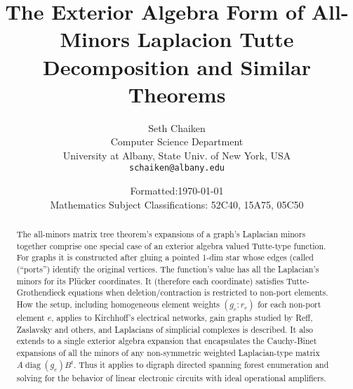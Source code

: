 \documentclass[12pt]{article}
\title{The Exterior Algebra Form of All-Minors Laplacion Tutte
  Decomposition and Similar Theorems}
\author{Seth Chaiken\\
\small Computer Science Department\\[-0.8ex]
\small University at Albany, State Univ. of New York, USA\\[-0.8ex]
\small \texttt{schaiken@albany.edu}
}
\date{
Formatted:\today\\
\small Mathematics Subject Classifications: 52C40, 15A75, 05C50}
\begin{document}
\maketitle

\begin{abstract}
  The all-minors matrix tree theorem's expansions of a graph's
  Laplacian minors together comprise one special case of an exterior
  algebra valued Tutte-type function.  For graphs it is constructed
  after gluing a pointed 1-dim star whose edges (called (``ports'')
  identify the original vertices.  The function's value has all the
  Laplacian's minors for its Pl{\"u}cker coordinates. It (therefore
  each coordinate) satisfies Tutte-Grothendieck equations when
  deletion/contraction is restricted to non-port elements.  How the
  setup, including homogeneous element weights $(g_e:r_e)$ for each
  non-port element $e$, applies to Kirchhoff's electrical networks,
  gain graphs studied by Reff, Zaslavsky and others, and Laplacians of
  simplicial complexes is described.  It also extends to a single
  exterior algebra expansion that encapsulates the Cauchy-Binet
  expansions of all the minors of any non-symmetric weighted
  Laplacian-type matrix $A\operatorname{diag}(g_e)B^{t}$.  Thus it
  applies to digraph directed spanning forest enumeration and solving
  for the behavior of linear electronic circuits with ideal
  operational amplifiers.
\end{abstract}
\end{document}
